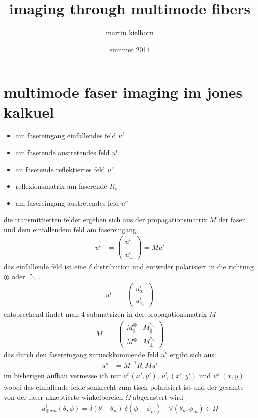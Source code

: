 \documentclass{article}
\author{martin kielhorn}
\title{imaging through multimode fibers}
\date{summer 2014}
\begin{document}
\maketitle
\section{multimode faser imaging im jones kalkuel}



\begin{itemize}
\item am fasereingang einfallendes feld $u^i$
\item am faserende austretendes feld $u^t$
\item an faserende reflektiertes feld $u^r$
\item reflexionsmatrix am faserende $R_s$
\item am fasereingang austretendes feld $u^o$
\end{itemize}

die transmittierten felder ergeben sich aus der propagationsmatrix $M$
der faser und dem einfallendem feld am fasereingang.
\begin{align}
  u^t &= \begin{pmatrix}u^t_\parallel \\ u^t_\perp\end{pmatrix} = M u^i
\end{align}
das einfallende feld ist eine $\delta$ distribution und entweder
polarisiert in die richtung $\circledast$ oder $\nwarrow$.
\begin{align}
  u^i &= \begin{pmatrix}u^i_\circledast \\ u^i_\nwarrow\end{pmatrix}
\end{align}
entsprechend findet man 4 submatrizen in der propagationsmatrix $M$
\begin{align}
  M &= \begin{pmatrix}
    M^\circledast_\parallel & M^\nwarrow_\parallel \\
    M^\circledast_\perp & M^\nwarrow_\perp 
  \end{pmatrix}
\end{align}
das durch den fasereingang zurueckkommende feld $u^o$ ergibt sich aus:
\begin{align}
  \label{eq:ruecktrafo}
  u^o &= M^{-1} R_s M u^i
\end{align}
im bisherigen aufbau vermesse ich nur $u^t_\parallel(x',y')$,
$u^t_\perp(x',y')$ und $u^o_\perp(x,y)$ wobei das einfallende felde
senkrecht zum tisch polarisiert ist und der gesamte von der faser
akzeptierte winkelbereich $\Omega$ abgerastert wird
\begin{align}
  u^i_{\circledast nm}(\theta,\phi) = \delta(\theta-\theta_n)\ \delta(\phi-\phi_m) \quad \forall (\theta_n,\phi_m)\in\Omega
\end{align}
 
\end{document}
